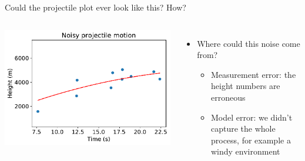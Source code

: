 \documentclass[aspectratio=169, handout]{beamer}
\begin{document}
\begin{frame}{Could the projectile plot ever look like this?  How?}

\begin{columns}

\includegraphics[scale=0.5]{data/Huang_et_al/projectile_noise.pdf}


\pause

\begin{itemize}
\item Where could this noise come from?
\begin{itemize}
\item Measurement error: the height numbers are erroneous
\item Model error: we didn't capture the whole process, for example a windy environment
\end{itemize}
\end{itemize}
\end{columns}

\end{frame}
\end{document}
